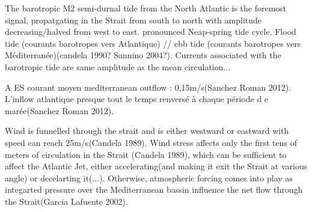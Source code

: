 The barotropic M2 semi-durnal tide from the North Atlantic is the foremost signal, propatgating in the Strait from south to north with amplitude decreasing/halved from west to east. pronounced Neap-spring tide cycle.  Flood tide (courants barotropes vers Atlantique) // ebb tide (courants barotropes vers Méditerranée)(candela 1990? Sannino 2004?). Currents associated with the barotropic tide are same amplitude as the mean circulation...


A ES courant moyen mediterranean outflow : 0,15m/s(Sanchez Roman 2012). L’inflow atlantique presque tout le temps renversé à chaque période d e marée(Sanchez Roman 2012).







 Wind is funnelled through the strait and is either westward or eastward with speed can reach 25m/s(Candela 1989). Wind stress affects only the first tens of meters of circulation in the Strait (Candela 1989), which can be sufficient to affect the Atlantic Jet, either accelerating(and making it exit the Strait at various angle) or decelarting it(...). Otherwise, atmospheric forcing comes into play as integarted pressure over the Mediterranean bassin influence the net flow through the Strait(Garcia Lafuente 2002).



